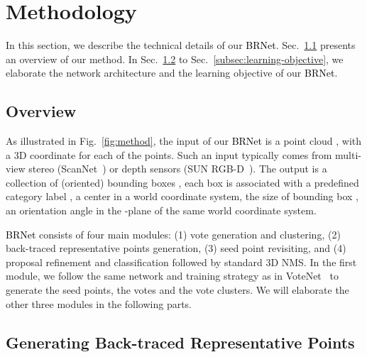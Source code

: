 \documentclass[final]{cvpr}
\newcommand{\method}{\textcolor{black}{BRNet }}
\newcommand{\methodnospace}{\textcolor{black}{BRNet}}
\begin{document}
\section{Methodology}


In this section, we describe the technical details of our \methodnospace. Sec.~\ref{sub:overview} presents an overview of our method.
In Sec.~\ref{sub:representative_point_generation} to Sec.~\ref{subsec:learning-objective}, we elaborate the network architecture and the learning objective of our \methodnospace.




\subsection{Overview}
\label{sub:overview}

As illustrated in Fig.~\ref{fig:method}, the input of our \method is a point cloud , with a 3D coordinate for each of the  points.
Such an input typically comes from multi-view stereo (\eg ScanNet~\cite{scannet}) or depth sensors (\eg SUN RGB-D~\cite{sunrgb-d}).
The output is a collection of (oriented) bounding boxes , each box  is associated with a predefined category label , a center  in a world coordinate system, the size of bounding box , an orientation angle  in the -plane of the same world coordinate system.


\method consists of four main modules: (1) vote generation and clustering, (2) back-traced representative points generation, (3) seed point revisiting, and (4) proposal refinement and classification followed by standard 3D NMS.
In the first module, we follow the same network and training strategy as in VoteNet~\cite{votenet} to generate the seed points, the votes and the vote clusters.
We will elaborate the other three modules in the following parts. 


\subsection{Generating Back-traced Representative Points}
\label{sub:representative_point_generation}
\end{document}
